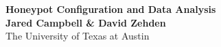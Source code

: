\documentclass[a0,landscape]{a0poster}
\begin{document}


\begin{minipage}[b]{0.55\linewidth}
\veryHuge \color{NavyBlue} \textbf{Honeypot Configuration and Data Analysis} \color{Black}\\ %
\huge \textbf{Jared Campbell \& David Zehden}\\ %
\huge The University of Texas at Austin\\ %
\end{minipage}
%
%
%
\begin{minipage}[b]{0.19\linewidth}
\end{minipage}

\vspace{1cm} %

\end{document}
